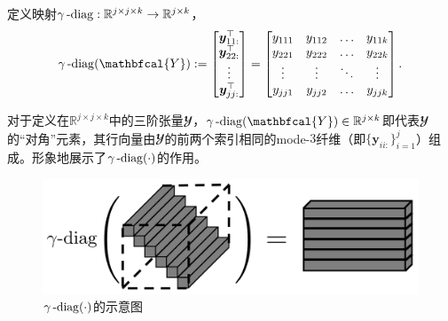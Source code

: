 \begin{definition}[三阶张量“对角”元素]\kaishu
	定义映射$\gamma\operatorname{-diag}:\mathbb{R}^{j\times j\times k}\rightarrow\mathbb{R}^{j\times k}$，
	\begin{equation*}
		\mydiag(\mathbfcal{Y}):=\begin{bmatrix}\boldsymbol{y}_{11:}^{\top}\\\boldsymbol{y}_{22:}^{\top}\\\vdots\\\boldsymbol{y}_{jj:}^{\top}\end{bmatrix}=\begin{bmatrix}y_{1 1 1}&y_{1 1 2}&\ldots&y_{1 1 k}\\y_{2 2 1}&y_{2 2 2}&\ldots&y_{2 2 k}\\\vdots&\vdots&\ddots&\vdots\\y_{j j 1}&y_{j j 2}&\ldots&y_{j j k}\end{bmatrix}.
	\end{equation*}

	
\end{definition}

\noindent 对于定义在$\mathbb{R}^{j\times j\times k}$中的三阶张量$\mathbfcal{Y}$，$\mydiag(\mathbfcal{Y}) \in \mathbb{R}^{j\times k}$即代表$\mathbfcal{Y}$的“对角”元素，其行向量由$\mathbfcal{Y}$的前两个索引相同的mode-$3$纤维（即$\{\boldsymbol{y}_{ii:}\}_{i=1}^{j}$）组成。形象地展示了$\gamma\operatorname{-diag}(\cdot)$的作用。

\begin{figure}[!ht]
	  \centering
	  \includegraphics[width=.7\linewidth]{figures/gammadiag.png}
	  \caption{$\gamma\operatorname{-diag}(\cdot)$的示意图}
	  \label{fig:diag3}
\end{figure}

